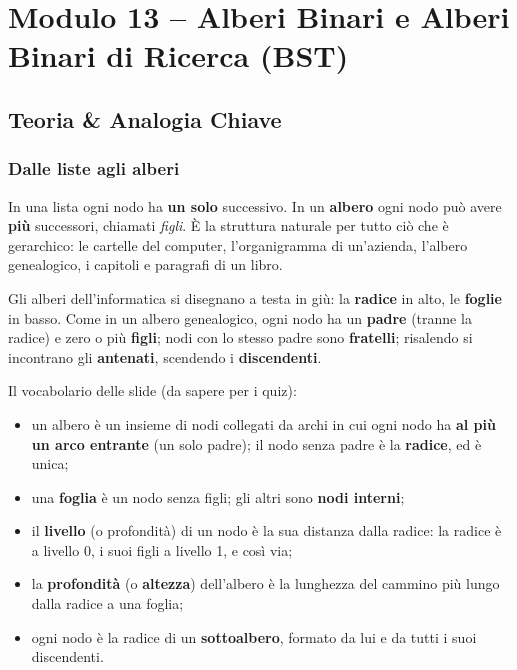 \chapter{Modulo 13 -- Alberi Binari e Alberi Binari di Ricerca (BST)}


\section{Teoria \& Analogia Chiave}

\subsection*{Dalle liste agli alberi}

In una lista ogni nodo ha \textbf{un solo} successivo. In un \textbf{albero} ogni nodo
può avere \textbf{più} successori, chiamati \emph{figli}. È la struttura naturale per
tutto ciò che è gerarchico: le cartelle del computer, l'organigramma di un'azienda,
l'albero genealogico, i capitoli e paragrafi di un libro.

\begin{analogia}
Gli alberi dell'informatica si disegnano a testa in giù: la \textbf{radice} in alto,
le \textbf{foglie} in basso. Come in un albero genealogico, ogni nodo ha un
\textbf{padre} (tranne la radice) e zero o più \textbf{figli}; nodi con lo stesso padre
sono \textbf{fratelli}; risalendo si incontrano gli \textbf{antenati}, scendendo i
\textbf{discendenti}.
\end{analogia}

Il vocabolario delle slide (da sapere per i quiz):
\begin{itemize}
  \item un albero è un insieme di nodi collegati da archi in cui ogni nodo ha
        \textbf{al più un arco entrante} (un solo padre); il nodo senza padre è la
        \textbf{radice}, ed è unica;
  \item una \textbf{foglia} è un nodo senza figli; gli altri sono \textbf{nodi interni};
  \item il \textbf{livello} (o profondità) di un nodo è la sua distanza dalla radice: la
        radice è a livello 0, i suoi figli a livello 1, e così via;
  \item la \textbf{profondità} (o \textbf{altezza}) dell'albero è la lunghezza del
        cammino più lungo dalla radice a una foglia;
  \item ogni nodo è la radice di un \textbf{sottoalbero}, formato da lui e da tutti i suoi
        discendenti.
\end{itemize}

